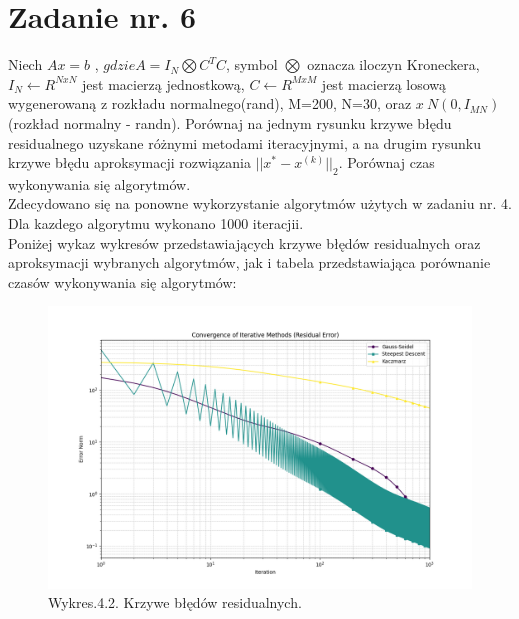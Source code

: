 \documentclass{article}
\begin{document}
\section{Zadanie nr. 6}

Niech $Ax = b$ , $gdzie A = I_N \bigotimes C^TC $, symbol $\bigotimes$ oznacza iloczyn Kroneckera,
$I_N \gets R^{NxN}$ jest macierzą jednostkową, $C \gets R^{MxM}$ jest macierzą losową wygenerowaną z rozkładu normalnego(rand), M=200, N=30, oraz $x~N(0,I_{MN})$ (rozkład normalny - randn).
Porównaj na jednym rysunku krzywe błędu residualnego uzyskane różnymi metodami iteracyjnymi, a na drugim rysunku krzywe błędu aproksymacji rozwiązania $||x^*-x^{(k)}||_2$. Porównaj czas wykonywania się algorytmów.\\

Zdecydowano się na ponowne wykorzystanie algorytmów użytych w zadaniu nr. 4.
Dla kazdego algorytmu wykonano 1000 iteracjii.\\
Poniżej wykaz wykresów przedstawiających krzywe błędów residualnych oraz aproksymacji wybranych algorytmów,
jak i tabela przedstawiająca porównanie czasów wykonywania się algorytmów:

\begin{figure}[H]
  \includegraphics[width=1.5\textwidth, center]{zad6_1.png}
  \centering
  \captionsetup[Tabela]{name=New Table Name}
  \caption*{Wykres.4.2. Krzywe błędów residualnych.}
\end{figure}
\end{document}
